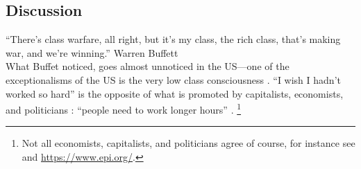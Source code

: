 \documentclass[10pt, letterpaper]{article}
\begin{document}
\begin{spacing}{1.8}
\subsection{Discussion}

``There's class warfare, all right, but it's my class, the rich class, that's making war, and we're winning.'' Warren Buffett\\

What Buffet noticed, goes almost unnoticed in the US---one of the exceptionalisms of the US is the very low class consciousness \citep{lipset97, lipset00}.
%
%
``I wish I hadn't worked so hard''  is the opposite of  what is promoted by
capitalists, economists, and politicians \citep{wang11b,wight2005adam}: ``people need to work longer hours'' %
\citep{smithABC15jul8}. \footnote{Not all economists, capitalists, and politicians agree of course,
  for instance see \citet{wight2005adam} and \url{https://www.epi.org/}.}
 



\end{spacing}
\end{document}
